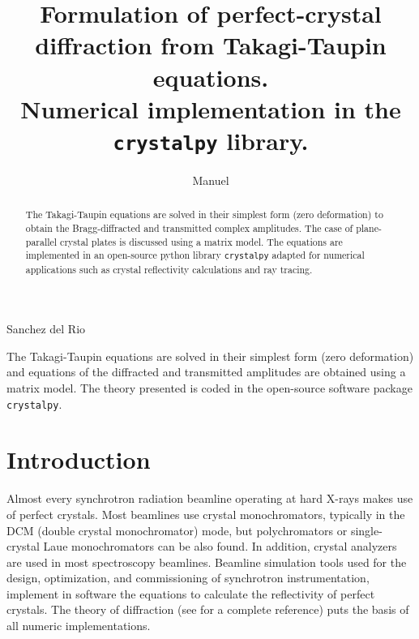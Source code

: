 \documentclass[preprint]{iucr}              %
\begin{document}

\title{Formulation of perfect-crystal diffraction  from Takagi-Taupin equations. \\ Numerical implementation in the \texttt{crystalpy} library.}


\author[a]{Manuel}{Sanchez del Rio}



\maketitle   %

\begin{synopsis}
The Takagi-Taupin equations are solved in their simplest form (zero deformation) and equations of the diffracted and transmitted amplitudes are obtained using a matrix model. The theory presented is coded in the open-source software package {\tt crystalpy}.
\end{synopsis}

\begin{abstract}

The Takagi-Taupin equations are solved in their simplest form (zero deformation) to obtain the Bragg-diffracted and transmitted complex amplitudes. The case of plane-parallel crystal plates is discussed using a matrix model. The equations are implemented in an open-source python library \texttt{crystalpy} adapted for numerical applications such as crystal reflectivity calculations and ray tracing.

\end{abstract}


%
\section{Introduction}
\label{sec:Intro}

Almost every synchrotron radiation beamline operating at hard X-rays makes use of perfect crystals.  
Most beamlines use crystal monochromators, typically in the DCM (double crystal monochromator) mode, but polychromators or single-crystal Laue monochromators can be also found. In addition, crystal analyzers are used in most spectroscopy beamlines. 
Beamline simulation tools used for the design, optimization, and commissioning of synchrotron instrumentation, implement in software the equations to calculate the reflectivity of perfect crystals. The theory of diffraction (see \cite{authierbook} for a complete reference) puts the basis of all numeric implementations. 
\end{document}
